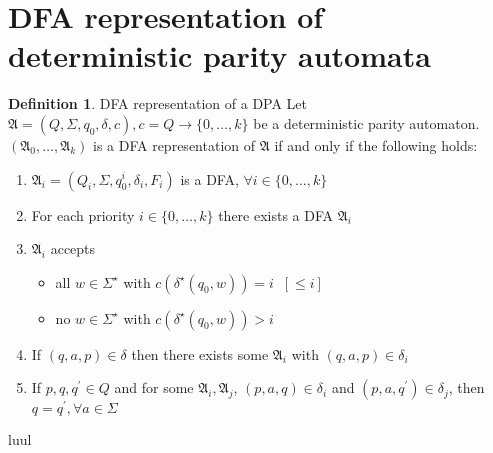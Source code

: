 \documentclass[10pt]{article}
\theoremstyle{definition}
\newtheorem{definition}{Definition}
\theoremstyle{plain}
\theoremstyle{remark}
\begin{document}

\section{DFA representation of deterministic parity automata}
  \begin{definition}{DFA representation of a DPA}
    Let $\mathfrak{A}=(Q,\Sigma,q_0,\delta,c),c=Q\rightarrow \{0,\dots,k\}$ be a
    deterministic parity automaton. $(\mathfrak{A}_0,\dots,\mathfrak{A}_k)$ is
    a DFA representation of $\mathfrak{A}$ if and only if the following holds:
    \begin{enumerate}
      \item $\mathfrak{A}_i=(Q_i,\Sigma, q_0^i, \delta_i, F_i)$ is a DFA,
              $\forall i\in \{0,\dots,k\}$
      \item For each priority $i\in \{0,\dots,k\}$ there exists a DFA
              $\mathfrak{A}_i$
      \item $\mathfrak{A}_i$ accepts
            \begin{itemize}
              \item all $w\in \Sigma^\star$ with $c(\delta^\star(q_0,w))=i \;\;[\leq i]$
              \item no $w\in \Sigma ^\star$ with $c(\delta^\star(q_0,w))>i$
            \end{itemize}
      \item If $(q,a,p)\in \delta$ then there exists some $\mathfrak{A}_i$ with
              $(q,a,p)\in \delta_i$
      \item If $p,q,q^\prime \in Q$ and for some
              $\mathfrak{A}_i,\mathfrak{A}_j$, $(p,a,q)\in \delta_i$ and
              $(p,a,q^\prime)\in \delta_j$, then $q=q^\prime, \forall a\in
              \Sigma$
    \end{enumerate}
    luul
  \end{definition}
\end{document}
